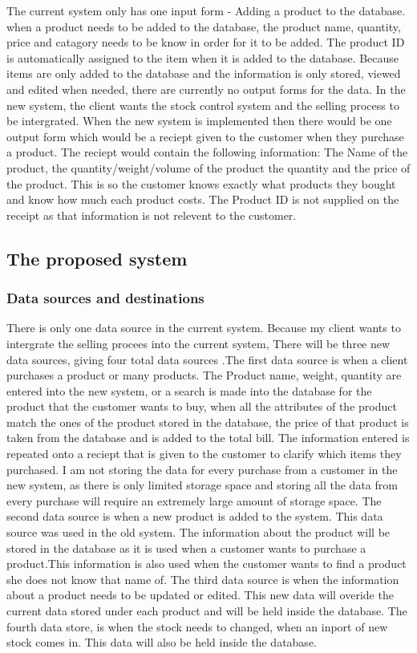 The current system only has one input form - Adding a product to the database. when a product needs to be added to the database, the product name, quantity, price and catagory needs to be know in order for it to be added. The product ID is automatically assigned to the item when it is added to the database. Because items are only added to the database and the information is only stored, viewed and edited when needed, there are currently no output forms for the data. In the new system, the client wants the stock control system and the selling process to be intergrated. When the new system is implemented then there would be one output form which would be a reciept given to the customer when they purchase a product. The reciept would contain the following information: The Name of the product, the quantity/weight/volume of the product the quantity and the price of the product. This is so the customer knows exactly what products they bought and know how much each product costs. The Product ID is not supplied on the receipt as that information is not relevent to the customer.

\subsection{The proposed system}

\subsubsection{Data sources and destinations}

There is only one data source in the current system. Because my client wants to intergrate the selling procees into the current system, There will be three new data sources, giving four total data sources .The first data source is when a client purchases a product or many products. The Product name, weight, quantity are entered into the new system, or a search is made into the database for the product that the customer wants to buy, when all the attributes of the product match the ones of the product stored in the database, the price of that product is taken from the database and is added to the total bill. The information entered is repeated onto a reciept that is given to the customer to clarify which items they purchased. I am not storing the data for every purchase from a customer in the new system, as there is only limited storage space and storing all the data from every purchase will require an extremely large amount of storage space. The second data source is when a new product is added to the system. This data source was used in the old system. The information about the product will be stored in the database as it is used when a customer wants to purchase a product.This information is also used when the customer wants to find a product she does not know that name of.  The third data source is when the information about a product needs to be updated or edited. This new data will overide the current data stored under each product and will be held inside the database. The fourth data store, is when the stock needs to changed, when an inport of new stock comes in. This data will also be held inside the database.\par


